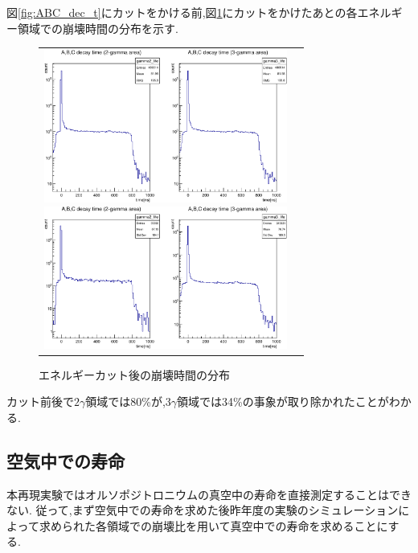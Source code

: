 図\ref{fig:ABC_dec_t}にカットをかける前,図\ref{fig:ABC_dec_t_cut}にカットをかけたあとの各エネルギー領域での崩壊時間の分布を示す.
\begin{figure}[H]
	\begin{tabular}{cc}
		\begin{minipage}{0.5\hsize}
			\begin{center}
				\includegraphics[width=80mm]{fig/isb/abc_dec_t_E.pdf}
				\caption{エネルギーカット前の崩壊時間の分布}
				\label{fig:ABC_dec_t}
			\end{center}
		\end{minipage}
		\begin{minipage}{0.5\hsize}
			\begin{center}
				\includegraphics[width=80mm]{fig/isb/abc_dec_t_E_cut.pdf}
				\caption{エネルギーカット後の崩壊時間の分布}
				\label{fig:ABC_dec_t_cut}
			\end{center}
		\end{minipage}
	\end{tabular}
\end{figure}
カット前後で$2\gamma$領域では80\%が,$3\gamma$領域では34\%の事象が取り除かれたことがわかる.


\subsection{空気中での寿命}
本再現実験ではオルソポジトロニウムの真空中の寿命を直接測定することはできない.
従って,まず空気中での寿命を求めた後昨年度の実験のシミュレーションによって求められた各領域での崩壊比を用いて真空中での寿命を求めることにする.

